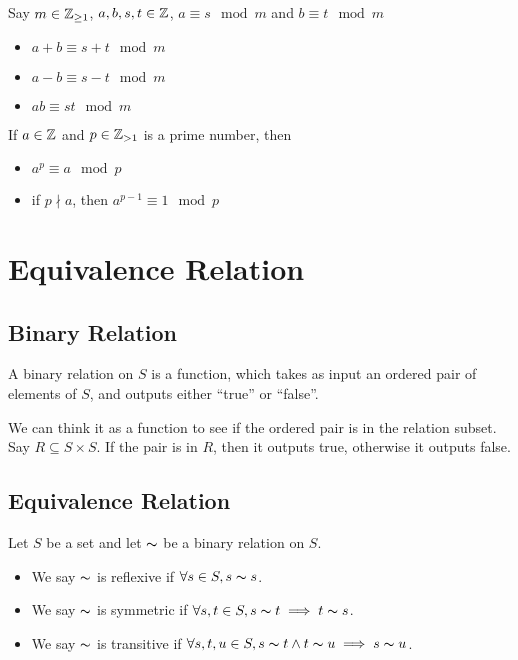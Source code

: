 \documentclass[a4paper]{article}
\begin{document}
\begin{thm}
Say $m \in \mathbb{Z}_{\geq 1}$, $a, b, s, t \in \mathbb{Z}$, $a \equiv s \mod m$ and $b \equiv t \mod m$
\begin{itemize}
	\item $a+b \equiv s+t \mod m$
	\item $a-b \equiv s-t \mod m$
	\item $ab \equiv st \mod m$
\end{itemize}
\end{thm}

\begin{thm}
If $a \in \mathbb{Z}$ and $p \in \mathbb{Z}_{>1}$ is a prime number, then
\begin{itemize}
	\item $a^p \equiv a \mod p$
	\item if $p \nmid a$, then $a^{p-1} \equiv 1 \mod p$
\end{itemize}
\end{thm}

\section{Equivalence Relation}
\subsection{Binary Relation}
\begin{defi}
A binary relation on $S$ is a function, which takes as input an ordered pair of elements of $S$, and outputs either “true” or “false”.
\end{defi}
We can think it as a function to see if the ordered pair is in the relation subset. Say $R \subseteq S \times S$. If the pair is in $R$, then it outputs true, otherwise it outputs false.

\subsection{Equivalence Relation}
\begin{defi}
Let $S$ be a set and let $\thicksim$ be a binary relation on $S$.
\begin{itemize}
	\item We say $\thicksim$ is reflexive if $\forall s \in S, s \thicksim s$.
	\item We say $\thicksim$ is symmetric if $\forall s,t \in S, s \thicksim t \implies t \thicksim s$.
	\item We say $\thicksim$ is transitive if $\forall s,t,u \in S, s \thicksim t \land t \thicksim u \implies s \thicksim u$.
\end{itemize}
\end{defi}
\end{document}
